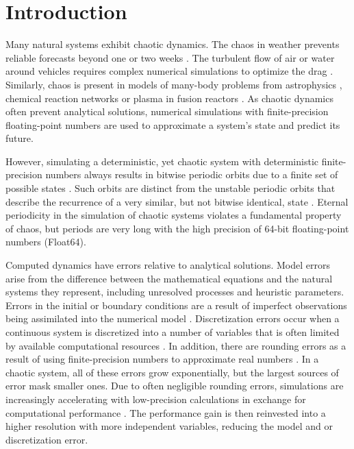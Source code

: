 \section{Introduction}

Many natural systems exhibit chaotic dynamics. The chaos in weather prevents reliable forecasts beyond
one or two weeks \citep{Bauer2015,Palmer2019}. The turbulent flow of air or water around vehicles requires
complex numerical simulations to optimize the drag \citep{Cummings2015,Moran2003}. Similarly, chaos is present
in models of many-body problems from astrophysics \citep{Cornish2001,Springel2005}, chemical reaction networks
\citep{Coveney2016} or plasma in fusion reactors
\citep{DIppolito2011,Ricci2012,ITERPhysicsExpertGrouponConfinementandTransport1999}. As chaotic dynamics often
prevent analytical solutions, numerical simulations with finite-precision floating-point numbers \citep{IEEE1985}
are used to approximate a system’s state and predict its future.

However, simulating a deterministic, yet chaotic system with deterministic finite-precision numbers always results in
bitwise periodic orbits due to a finite set of possible states \citep{Boghosian2019}. Such orbits are distinct from the
unstable periodic orbits that describe the recurrence of a very similar, but not bitwise identical, state \citep{Cvitanovic2013}.
Eternal periodicity in the simulation of chaotic systems violates a fundamental property of chaos, but periods are very
long with the high precision of 64-bit floating-point numbers (Float64).

Computed dynamics have errors relative to analytical solutions. Model errors arise from the difference between the
mathematical equations and the natural systems they represent, including unresolved processes and heuristic parameters.
Errors in the initial or boundary conditions are a result of imperfect observations being assimilated into the numerical model
\citep{Ghil1991}. Discretization errors occur when a continuous system is discretized into a number of variables that is
often limited by available computational resources \citep{Butcher2016}. In addition, there are rounding errors as a result
of using finite-precision numbers to approximate real numbers \citep{Higham2002}. In a chaotic system, all of these errors
grow exponentially, but the largest sources of error mask smaller ones. Due to often negligible rounding errors, simulations
are increasingly accelerating with low-precision calculations in exchange for computational performance \citep{Fuhrer2018,
Nakano2018,Vana2017}. The performance gain is then reinvested into a higher resolution with more independent variables,
reducing the model and or discretization error.

